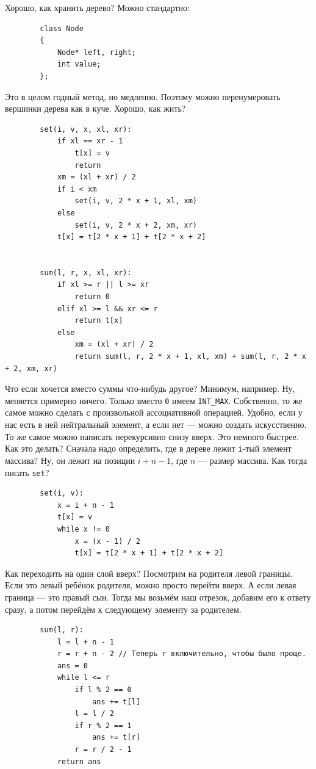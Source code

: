 \documentclass{article}
\newcommand{\pseudo}{PseudoLexer.py:PseudoLexer -x}
\newcommand{\pseudocode}[1]{\texttt{#1}}
\begin{document}
    Хорошо, как хранить дерево? Можно стандартно:
    \begin{verbatim}
        class Node
        {
            Node* left, right;
            int value;
        };
    \end{verbatim}
    Это в целом годный метод, но медленно. Поэтому можно перенумеровать вершинки дерева как в куче. Хорошо, как жить?
    \begin{verbatim}
        set(i, v, x, xl, xr):
            if xl == xr - 1
                t[x] = v
                return
            xm = (xl + xr) / 2
            if i < xm
                set(i, v, 2 * x + 1, xl, xm)
            else
                set(i, v, 2 * x + 2, xm, xr)
            t[x] = t[2 * x + 1] + t[2 * x + 2]


        sum(l, r, x, xl, xr):
            if xl >= r || l >= xr
                return 0
            elif xl >= l && xr <= r
                return t[x]
            else
                xm = (xl + xr) / 2
                return sum(l, r, 2 * x + 1, xl, xm) + sum(l, r, 2 * x + 2, xm, xr)
    \end{verbatim}
    Что если хочется вместо суммы что-нибудь другое? Минимум, например. Ну, меняется примерно ничего. Только вместо \pseudocode{0} имеем \texttt{INT_MAX}. Собственно, то же самое можно сделать с произвольной ассоциативной операцией. Удобно, если у нас есть в ней нейтральный элемент, а если нет --- можно создать искусственно.\\
    То же самое можно написать нерекурсивно снизу вверх. Это немного быстрее. Как это делать? Сначала надо определить, где в дереве лежит \pseudocode{i}-тый элемент массива? Ну, он лежит на позиции $i+n-1$, где $n$ --- размер массива. Как тогда писать \pseudocode{set}?
    \begin{verbatim}
        set(i, v):
            x = i + n - 1
            t[x] = v
            while x != 0
                x = (x - 1) / 2
                t[x] = t[2 * x + 1] + t[2 * x + 2]
    \end{verbatim} 
    Как переходить на один слой вверх? Посмотрим на родителя левой границы. Если это левый ребёнок родителя, можно просто перейти вверх. А если левая граница --- это правый сын. Тогда мы возьмём наш отрезок, добавим его к ответу сразу, а потом перейдём к следующему элементу за родителем.
    \begin{verbatim}
        sum(l, r):
            l = l + n - 1
            r = r + n - 2 // Теперь r включительно, чтобы было проще.
            ans = 0
            while l <= r
                if l % 2 == 0
                    ans += t[l]
                l = l / 2
                if r % 2 == 1
                    ans += t[r]
                r = r / 2 - 1
            return ans
    \end{verbatim}
\end{document}
